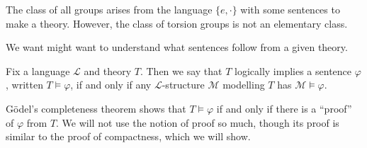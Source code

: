 \documentclass[../notes.tex]{subfiles}
\begin{document}
\begin{example}
	The class of all groups arises from the language $\{e,\cdot\}$ with some sentences to make a theory. However, the class of torsion groups is not an elementary class.
\end{example}
We want might want to understand what sentences follow from a given theory.
\begin{definition}
	Fix a language $\mathcal L$ and theory $T$. Then we say that $T$ logically implies a sentence $\varphi$, written $T\models\varphi$, if and only if any $\mathcal L$-structure $\mathcal M$ modelling $T$ has $\mathcal M\models\varphi$.
\end{definition}
\begin{remark}
	G\"odel's completeness theorem shows that $T\models\varphi$ if and only if there is a ``proof'' of $\varphi$ from $T$. We will not use the notion of proof so much, though its proof is similar to the proof of compactness, which we will show.
\end{remark}
\end{document}
